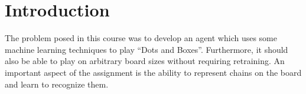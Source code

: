 \section{Introduction}

The problem posed in this course was to develop an agent which uses some machine learning techniques to play ``Dots and Boxes''. Furthermore, it should also be able to play on arbitrary board sizes without requiring retraining. An important aspect of the assignment is the ability to represent chains on the board and learn to recognize them.